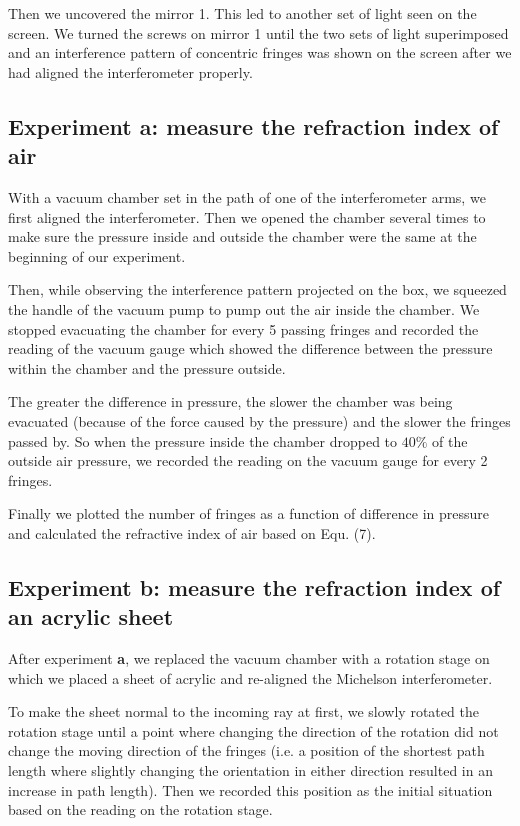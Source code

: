 \documentclass[12pt]{article}
\begin{document}
Then we uncovered the mirror 1. This led to another set of light seen on the screen. We turned the screws on mirror 1 until the two sets of light superimposed and an interference pattern of concentric fringes was shown on the screen after we had aligned the interferometer properly. 

\subsection{Experiment a: measure the refraction index of air }
With a vacuum chamber set in the path of one of the interferometer arms, we first aligned the interferometer. Then we opened the chamber several times to make sure the pressure inside and outside the chamber were the same at the beginning of our experiment.

Then, while observing the interference pattern projected on the box, we squeezed the handle of the vacuum pump to pump out the air inside the chamber. We stopped evacuating the chamber for every  5 passing fringes and recorded the reading of the vacuum gauge which showed the difference between the pressure within the chamber and the pressure outside.

The greater the difference in pressure, the slower the chamber was being evacuated (because of the force caused by the pressure) and the slower the fringes passed by. So when the pressure inside the chamber dropped to $40\%$ of the outside air pressure, we recorded the reading on the vacuum gauge for every 2 fringes.  

Finally we plotted the number of fringes as a function of difference in pressure and calculated the refractive index of air based on Equ. (7). 

\subsection{Experiment b: measure the refraction index of an acrylic sheet }
After experiment \textbf{a}, we replaced the vacuum chamber with a rotation stage on which we placed a sheet of acrylic and re-aligned the Michelson interferometer. 

To make the sheet normal to the incoming ray at first, we slowly rotated the rotation stage until a point where changing the direction of the rotation did not change the moving direction of the fringes (i.e. a position of the shortest path length where slightly changing the orientation in either direction resulted in an increase in path length). Then we recorded this position as the initial situation based on the reading on the rotation stage. 
\end{document}
